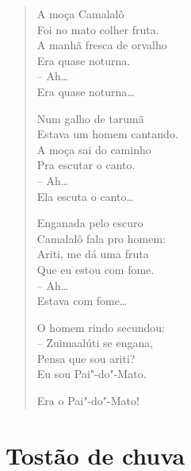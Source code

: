\begin{verse}
A moça Camalalô\\
Foi no mato colher fruta.\\
A manhã fresca de orvalho\\
Era quase noturna.\\
\qquad-- Ah\ldots{}\\
Era quase noturna\ldots{}

Num galho de tarumã\\
Estava um homem cantando.\\
A moça sai do caminho\\
Pra escutar o canto.\\
\qquad-- Ah\ldots{}\\
Ela escuta o canto\ldots{}

Enganada pelo escuro\\
Camalalô fala pro homem:\\
Ariti, me dá uma fruta\\
Que eu estou com fome.\\
\qquad-- Ah\ldots{}\\
Estava com fome\ldots{}

O homem rindo secundou:\\
-- Zuimaalúti se engana,\\
Pensa que sou ariti?\\
Eu sou Pai"-do"-Mato.

Era o Pai"-do"-Mato!
\end{verse}

\chapter{Tostão de chuva}

